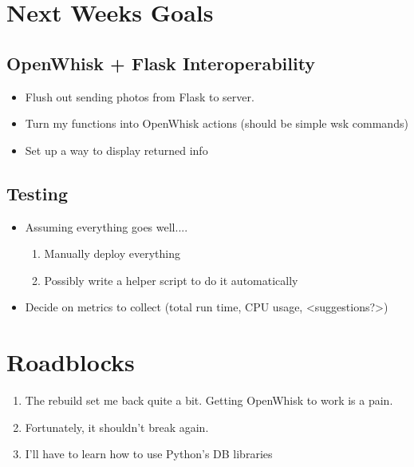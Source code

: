 \documentclass[paper=a4, fontsize=12pt]{scrartcl} %
\numberwithin{equation}{section} %
\numberwithin{figure}{section} %
\numberwithin{table}{section} %
\begin{document}
\section{Next Weeks Goals}


\subsection{OpenWhisk + Flask Interoperability}
\begin{itemize}
	\item Flush out sending photos from Flask to server.
	\item Turn my functions into OpenWhisk actions (should be simple wsk commands)
	\item Set up a way to display returned info
	
\end{itemize}


\subsection{Testing}
\begin{itemize}
	\item Assuming everything goes well....
		\begin{enumerate}
			\item Manually deploy everything
			\item Possibly write a helper script to do it automatically
		\end{enumerate}
	\item Decide on metrics to collect (total run time, CPU usage, <suggestions?>)
\end{itemize}



\section{Roadblocks}
\begin{enumerate}
	\item  The rebuild set me back quite a bit. Getting OpenWhisk to work is a pain.
	\item  Fortunately, it shouldn't break again.
	\item I'll have to learn how to use Python's DB libraries  
\end{enumerate}
\end{document}
